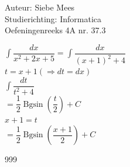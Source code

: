 \documentclass[a4paper]{article}
\newcommand{\Bgsin}{\operatorname{Bgsin}}
\begin{document}
  
\noindent \large Auteur: Siebe Mees \\
\noindent \large Studierichting: Informatica\\
\noindent \large Oefeningenreeks 4A nr. 37.3\\

\medskip

\normalsize

$\displaystyle\int \dfrac{dx}{x^2+2x+5} = \displaystyle\int \dfrac{dx}{(x+1)^2+4}$\\

$t=x+1 \left(\Rightarrow dt=dx \right)$\\

$\displaystyle\int \dfrac{dt}{t^2+4}$\\

$=\dfrac{1}{2}\Bgsin\left(\dfrac{t}{2}\right)+C$\\

$x+1=t$\\

$=\dfrac{1}{2}\Bgsin\left(\dfrac{x+1}{2}\right)+C$\\

\begin{thebibliography}{999}
\end{thebibliography}
\end{document}
